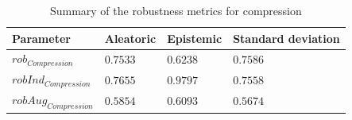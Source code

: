 \begin{table}[h]
	\centering
	\begin{tabular}{|| l | l | l | l ||} 
		\hline
		\textbf{Parameter} & \textbf{Aleatoric} & \textbf{Epistemic} & \textbf{Standard deviation} \\
		\hline
		\hline
		$rob_{Compression}$ & $0.7533$ & $0.6238$ & $0.7586$ \\
		$robInd_{Compression}$ & $0.7655$ & $0.9797$ & $0.7558$ \\
		$robAug_{Compression}$ & $0.5854$ & $0.6093$ & $0.5674$ \\	
		\hline
	\end{tabular}	
	\caption{Summary of the robustness metrics for compression}
	\label{table:rob_co}
\end{table}